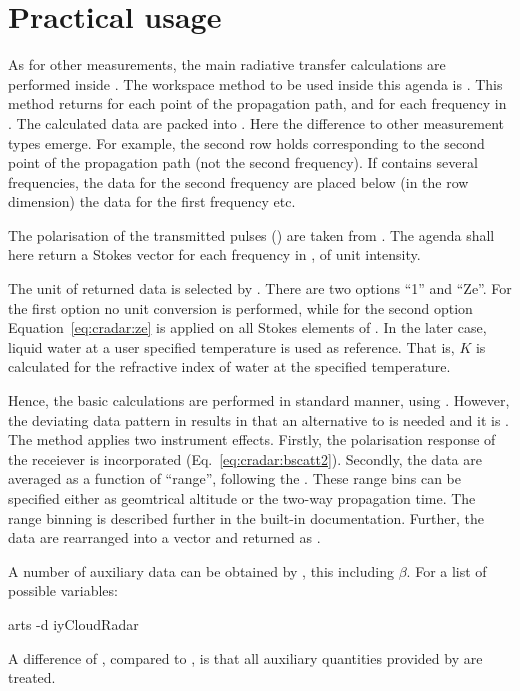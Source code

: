 \section{Practical usage}
\label{sec:cradar:usage}

As for other measurements, the main radiative transfer calculations are
performed inside . The workspace method to be used
inside this agenda is . This method returns 
for each point of the propagation path, and for each frequency in
. The calculated data are packed into . Here
the difference to other measurement types emerge. For example, the second row
holds  corresponding to the second point of the propagation path
(not the second frequency). If  contains several
frequencies, the data for the second frequency are placed below (in the row
dimension) the data for the first frequency etc. 

The polarisation of the transmitted pulses () are taken from
. The agenda shall here return a Stokes
vector for each frequency in , of unit intensity.

The unit of returned data is selected by . There are two
options ``1'' and ``Ze''. For the first option no unit conversion is performed,
while for the second option Equation~\ref{eq:cradar:ze} is applied on all
Stokes elements of . In the later case, liquid water at a user
specified temperature is used as reference. That is, $K$ is calculated for the
refractive index of water at the specified temperature.

Hence, the basic calculations are performed in standard manner, using
. However, the deviating data pattern in
 results in that an alternative to  is needed
and it is . The method applies two instrument effects.
Firstly, the polarisation response of the receiever is incorporated
(Eq.~\ref{eq:cradar:bscatt2}). Secondly, the data are averaged as a
function of ``range'', following the . These range bins
can be specified either as geomtrical altitude or the two-way propagation time.
The range binning is described further in the built-in documentation.
Further, the data are rearranged into a vector and returned as .

A number of auxiliary data can be obtained by , this
including $\beta$. For a list of possible variables:
\begin{code}
arts -d iyCloudRadar
\end{code}
A difference of , compared to , is
that all auxiliary quantities provided by  are
treated.

